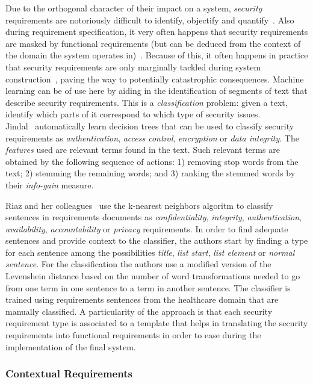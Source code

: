 Due to the orthogonal character of their impact on a system, \emph{security}
requirements are notoriously difficult to identify, objectify and
quantify~\cite{}. Also during requirement specification, it very often
happens that security requirements are masked by functional requirements
(but can be deduced from the context of the domain the system operates
in)~\cite{Riaz:2014}. Because of this, it often happens in practice that
security requirements are only marginally tackled during system
construction~\cite{}, paving the way to potentially catastrophic consequences.
Machine learning can be of use here by aiding in the identification of segments
of text that describe security requirements. This is a \emph{classification}
problem: given a text, identify which parts of it correspond to which
type of security issues.\\

Jindal\etal~\cite{Jildal:2016} automatically learn decision trees that can be
used to classify security requirements as \emph{authentication}, \emph{access
control}, \emph{encryption} or \emph{data integrity}. The \emph{features} used
are relevant terms found in the text. Such relevant terms are obtained by the
following sequence of actions: 1) removing stop words from the text; 2) stemming
the remaining words; and 3) ranking the stemmed words by their \emph{info-gain}
measure.

Riaz and her colleagues~\cite{Riaz:2014} use the k-nearest neighbors algoritm to
classify sentences in requirements documents as \emph{confidentiality},
\emph{integrity}, \emph{authentication}, \emph{availability},
\emph{accountability} or \emph{privacy} requirements. In order to find
adequate sentences and provide context to the classifier, the authors start by
finding a type for each sentence among the possibilities \emph{title}, \emph{list start}, \emph{list
element} or \emph{normal sentence}. For the classification the authors use a
modified version of the Levenshein distance based on the number of word transformations needed to go
from one term in one sentence to a term in another sentence. The classifier is
trained using requirements sentences from the healthcare domain that are
manually classified. A particularity of the approach is that each security
requirement type is associated to a template that helps in translating the
security requirements into functional requirements in order to ease during the
implementation of the final system. 


\cite{Knauss:2011} 

\subsubsection{Contextual Requirements} 

